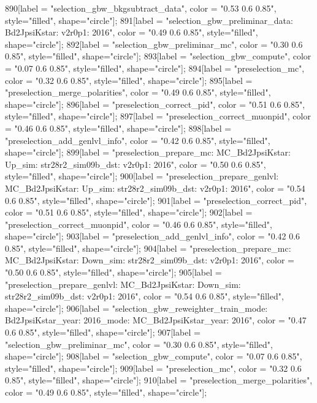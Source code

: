 {	890[label = "selection_gbw_bkgsubtract_data", color = "0.53 0.6 0.85", style="filled", shape="circle"];
	891[label = "selection_gbw_preliminar_data\nmode: Bd2JpsiKstar\nversion: v2r0p1\nyear: 2016", color = "0.49 0.6 0.85", style="filled", shape="circle"];
	892[label = "selection_gbw_preliminar_mc", color = "0.30 0.6 0.85", style="filled", shape="circle"];
	893[label = "selection_gbw_compute", color = "0.07 0.6 0.85", style="filled", shape="circle"];
	894[label = "preselection_mc", color = "0.32 0.6 0.85", style="filled", shape="circle"];
	895[label = "preselection_merge_polarities", color = "0.49 0.6 0.85", style="filled", shape="circle"];
	896[label = "preselection_correct_pid", color = "0.51 0.6 0.85", style="filled", shape="circle"];
	897[label = "preselection_correct_muonpid", color = "0.46 0.6 0.85", style="filled", shape="circle"];
	898[label = "preselection_add_genlvl_info", color = "0.42 0.6 0.85", style="filled", shape="circle"];
	899[label = "preselection_prepare_mc\nmode: MC_Bd2JpsiKstar\npolarity: Up\nstrip_sim: str28r2_sim09b_dst\nversion: v2r0p1\nyear: 2016", color = "0.50 0.6 0.85", style="filled", shape="circle"];
	900[label = "preselection_prepare_genlvl\nmode: MC_Bd2JpsiKstar\npolarity: Up\nstrip_sim: str28r2_sim09b_dst\nversion: v2r0p1\nyear: 2016", color = "0.54 0.6 0.85", style="filled", shape="circle"];
	901[label = "preselection_correct_pid", color = "0.51 0.6 0.85", style="filled", shape="circle"];
	902[label = "preselection_correct_muonpid", color = "0.46 0.6 0.85", style="filled", shape="circle"];
	903[label = "preselection_add_genlvl_info", color = "0.42 0.6 0.85", style="filled", shape="circle"];
	904[label = "preselection_prepare_mc\nmode: MC_Bd2JpsiKstar\npolarity: Down\nstrip_sim: str28r2_sim09b_dst\nversion: v2r0p1\nyear: 2016", color = "0.50 0.6 0.85", style="filled", shape="circle"];
	905[label = "preselection_prepare_genlvl\nmode: MC_Bd2JpsiKstar\npolarity: Down\nstrip_sim: str28r2_sim09b_dst\nversion: v2r0p1\nyear: 2016", color = "0.54 0.6 0.85", style="filled", shape="circle"];
	906[label = "selection_gbw_reweighter_train\ndata_mode: Bd2JpsiKstar\ndata_year: 2016\nmc_mode: MC_Bd2JpsiKstar\nmc_year: 2016", color = "0.47 0.6 0.85", style="filled", shape="circle"];
	907[label = "selection_gbw_preliminar_mc", color = "0.30 0.6 0.85", style="filled", shape="circle"];
	908[label = "selection_gbw_compute", color = "0.07 0.6 0.85", style="filled", shape="circle"];
	909[label = "preselection_mc", color = "0.32 0.6 0.85", style="filled", shape="circle"];
	910[label = "preselection_merge_polarities", color = "0.49 0.6 0.85", style="filled", shape="circle"];
}
